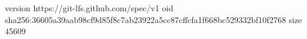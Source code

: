 version https://git-lfs.github.com/spec/v1
oid sha256:36605a39aab98cf9d85f8c7ab23922a5cc87cffcfa1f668bc529332bf10f2768
size 45609
